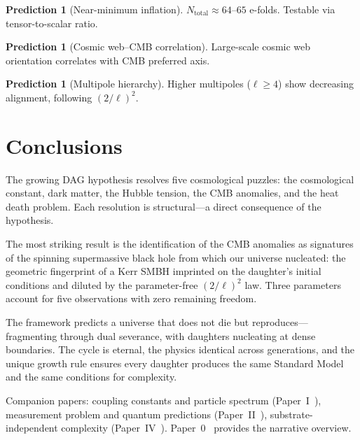 \documentclass[11pt,a4paper]{article}
\theoremstyle{plain}
\theoremstyle{definition}
\newtheorem{prediction}[theorem]{Prediction}
\theoremstyle{remark}
\begin{document}
\begin{prediction}[Near-minimum inflation]\label{pred:inflation}
$N_{\mathrm{total}} \approx 64$--$65$ e-folds.  Testable via tensor-to-scalar ratio.
\end{prediction}

\begin{prediction}[Cosmic web--CMB correlation]\label{pred:webaxis}
Large-scale cosmic web orientation correlates with CMB preferred axis.
\end{prediction}

\begin{prediction}[Multipole hierarchy]\label{pred:hierarchy}
Higher multipoles ($\ell \geq 4$) show decreasing alignment, following $(2/\ell)^2$.
\end{prediction}

\section{Conclusions}\label{sec:conclusions}

The growing DAG hypothesis resolves five cosmological puzzles: the cosmological
constant, dark matter, the Hubble tension, the CMB anomalies, and the heat death
problem.  Each resolution is structural---a direct consequence of the hypothesis.

The most striking result is the identification of the CMB anomalies as signatures
of the spinning supermassive black hole from which our universe nucleated: the
geometric fingerprint of a Kerr SMBH imprinted on the daughter's initial conditions
and diluted by the parameter-free $(2/\ell)^2$ law.  Three parameters account for
five observations with zero remaining freedom.

The framework predicts a universe that does not die but reproduces---fragmenting
through dual severance, with daughters nucleating at dense boundaries.  The cycle is
eternal, the physics identical across generations, and the unique growth rule ensures
every daughter produces the same Standard Model and the same conditions for
complexity.

Companion papers: coupling constants and particle spectrum (Paper~I~\cite{P1}),
measurement problem and quantum predictions (Paper~II~\cite{P2}),
substrate-independent complexity (Paper~IV~\cite{P4}).  Paper~0~\cite{P0} provides
the narrative overview.
\end{document}
